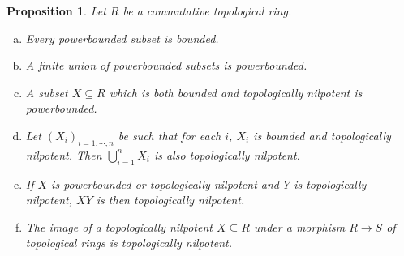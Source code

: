 \documentclass[8pt]{article}
\numberwithin{equation}{section}
\newtheorem{proposition}{Proposition}[subsection]
\begin{document}
\begin{proposition}
    \label{fact_11_5}
    Let $R$ be a commutative topological ring. 
    \begin{enumerate}[a.]
        \item Every powerbounded subset is bounded.
        \item A finite union of powerbounded subsets is powerbounded.
        \item A subset $X\subseteq R$ which is both bounded and topologically nilpotent is powerbounded.
        \item Let $(X_i)_{i=1,\cdots,n}$ be such that for each $i$, $X_i$ is bounded and topologically nilpotent. Then $\bigcup_{i=1}^nX_i$ is also topologically nilpotent.
        \item If $X$ is powerbounded or topologically nilpotent and $Y$ is topologically nilpotent, $XY$ is then topologically nilpotent.
        \item The image of a topologically nilpotent $X\subseteq R$ under a morphism $R\to S$ of topological rings is topologically nilpotent.
    \end{enumerate}
\end{proposition}
\end{document}
